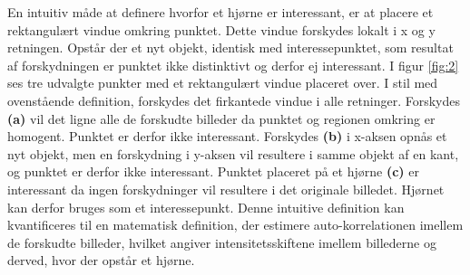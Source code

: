 En intuitiv måde at definere hvorfor et hjørne er interessant, er at placere et rektangulært vindue omkring punktet. Dette vindue forskydes lokalt i x og y retningen. Opstår der et nyt objekt, identisk med interessepunktet, som resultat af forskydningen er punktet ikke distinktivt og derfor ej interessant. I figur \ref{fig:2} ses tre udvalgte punkter med et rektangulært vindue placeret over. I stil med ovenstående definition, forskydes det firkantede vindue i alle retninger. Forskydes \textbf{(a)} vil det ligne alle de forskudte billeder da punktet og regionen omkring er homogent. Punktet er derfor ikke interessant. Forskydes \textbf{(b)} i x-aksen opnås et nyt objekt, men en forskydning i y-aksen vil resultere i samme objekt af en kant, og punktet er derfor ikke interessant. Punktet placeret på et hjørne \textbf{(c)} er interessant da ingen forskydninger vil resultere i det originale billedet. Hjørnet kan derfor bruges som et interessepunkt. Denne intuitive definition kan kvantificeres til en matematisk definition, der estimere auto-korrelationen imellem de forskudte billeder, hvilket angiver intensitetsskiftene imellem billederne og derved, hvor der opstår et hjørne. 

